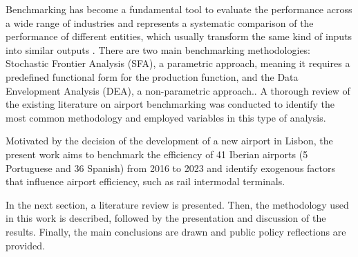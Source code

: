 Benchmarking has become a fundamental tool to evaluate the performance across a wide range of
industries and represents a systematic comparison of the performance of different entities, which usually
transform the same kind of inputs into similar outputs \cite{bogetoft2011}.
 There are two main benchmarking methodologies: Stochastic Frontier Analysis (SFA), a parametric approach, meaning it requires a predefined functional form
for the production function, and the Data Envelopment Analysis (DEA), a non-parametric approach.. A thorough review of the existing literature on airport benchmarking was conducted to
identify the most common methodology and employed variables in this type
of analysis.

Motivated by the decision of the development of a new airport in Lisbon, the present work aims to benchmark the efficiency of 41 Iberian airports (5 Portuguese and 36 Spanish) from 2016 to
2023 and identify exogenous factors that influence airport efficiency, such as rail intermodal terminals.

In the next section, a literature review is presented. Then, the methodology used in this work is described, followed by the presentation and discussion of the results. Finally, the main conclusions are drawn and public policy reflections are provided.